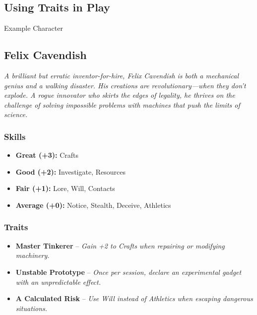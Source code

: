 \subsection{Using Traits in Play}
\begin{DndSidebar}[float=!t]{Example Character}
\subsection{Felix Cavendish}
\emph{A brilliant but erratic inventor-for-hire, Felix Cavendish is both a mechanical genius and a walking disaster. His creations are revolutionary—when they don’t explode. A rogue innovator who skirts the edges of legality, he thrives on the challenge of solving impossible problems with machines that push the limits of science.}

\subsubsection*{Skills}
\begin{itemize}
    \item \textbf{Great (+3):} Crafts
    \item \textbf{Good (+2):} Investigate, Resources
    \item \textbf{Fair (+1):} Lore, Will, Contacts
    \item \textbf{Average (+0):} Notice, Stealth, Deceive, Athletics
\end{itemize}

\subsubsection*{Traits}
\begin{itemize}
    \item \textbf{Master Tinkerer} – \emph{Gain +2 to Crafts when repairing or modifying machinery.}
    \item \textbf{Unstable Prototype} – \emph{Once per session, declare an experimental gadget with an unpredictable effect.}
    \item \textbf{A Calculated Risk} – \emph{Use Will instead of Athletics when escaping dangerous situations.}
\end{itemize}
\end{DndSidebar}
